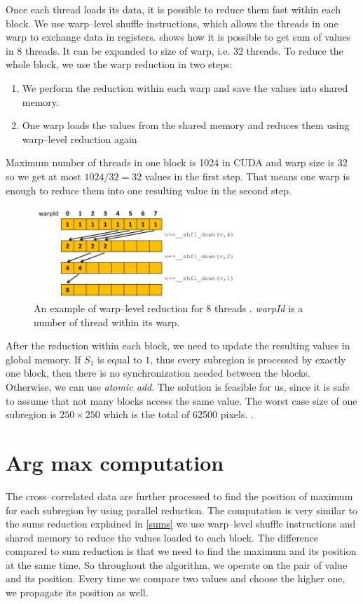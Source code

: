 Once each thread loads its data, it is possible to reduce them fast within each block. We use warp--level shuffle instructions, which allows the threads in one warp to exchange data in registers.  shows how it is possible to get sum of values in 8 threads. It can be expanded to size of warp, i.e. 32 threads. To reduce the whole block, we use the warp reduction in two steps:
\begin{enumerate}
	\item We perform the reduction within each warp and save the values into shared memory.
	\item One warp loads the values from the shared memory and reduces them using warp--level reduction again
\end{enumerate}
Maximum number of threads in one block is 1024 in CUDA and warp size is 32 so we get at most $1024/32 = 32$ values in the first step. That means one warp is enough to reduce them into one resulting value in the second step.

\begin{figure}
	\centering
	\includegraphics[width=0.7\textwidth]{img/warp_reduce}
	\caption{An example of warp--level reduction for 8 threads \cite{parallelReduction}. \emph{warpId} is a number of thread within its warp.}
	\label{warp_reduce}
\end{figure}

After the reduction within each block, we need to update the resulting values in global memory. If $S_1$ is equal to $1$, thus every subregion is processed by exactly one block, then there is no synchronization needed between the blocks. Otherwise, we can use \emph{atomic add}. The solution is feasible for us, since it is safe to assume that not many blocks access the same value. The worst case size of one subregion is $250 \times 250$ which is the total of 62500 pixels. . 


\section{Arg max computation}
The cross--correlated data are further processed to find the position of maximum for each subregion by using parallel reduction. The computation is very similar to the sums reduction explained in \cref{sums} we use warp--level shuffle instructions and shared memory to reduce the values loaded to each block. The difference compared to sum reduction is that we need to find the maximum and its position at the same time. So throughout the algorithm, we operate on the pair of value and its position. Every time we compare two values and choose the higher one, we propagate its position as well.

